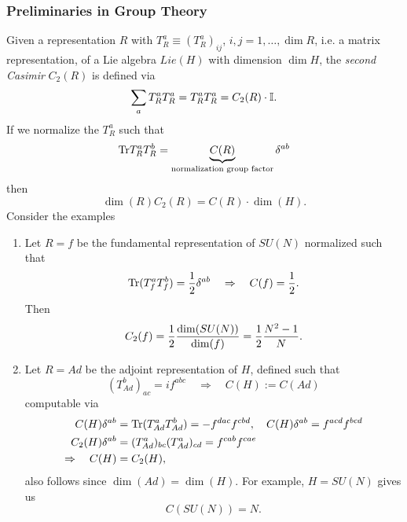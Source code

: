  \subsubsection{Preliminaries in Group Theory}
Given a representation $R$ with $T^a_R \equiv (T^a_R)_{ij}$, $i,j=1,\dots,\dim R$, i.e. a matrix representation, of a Lie algebra $Lie(H)$ with dimension $\dim H$, the \emph{second Casimir} $C_2(R)$ is defined via 
\begin{equation}
	\sum_a T^a_R T^a_R = T^a_R T^a_R= C_2(R) \cdot \mathbb{I}.
\end{equation}
If we normalize the $T^a_R$ such that
\begin{equation}
	\mathrm{Tr} T^a_R T^b_R = \underbrace{C(R)}_{\text{normalization group factor}} \delta^{ab}
\end{equation}
then
\begin{equation}
	\dim(R) C_2 (R) = C(R) \cdot \dim(H).
\end{equation}
Consider the examples
\begin{enumerate}
	\item Let $R=f$ be the fundamental representation of $SU(N)$ normalized such that\begin{equation}
		\mathrm{Tr}(T^a_f T^b_f) = \frac{1}{2} \delta^{ab} \quad \Rightarrow \quad C(f) = \frac{1}{2}.
	\end{equation}
	Then 
	\begin{equation}
		C_2(f) = \frac{1}{2} \frac{\dim(SU(N)) }{\dim(f)} = \frac{1}{2} \frac{N^2-1}{N}.
	\end{equation}
	\item Let $R=Ad$ be the adjoint representation of $H$, defined such that 
	\begin{equation}
		(T^b_{Ad})_{ac} = i f^{abc} \quad \Rightarrow \quad C(H) := C(Ad)
	\end{equation}
	computable via
	\begin{align*}
		C(H)\delta^{ab} &= \mathrm{Tr}(T^a_{Ad} T^b_{Ad})= -f^{dac} f^{cbd},\quad C(H) \delta^{ab} = f^{acd} f^{bcd} \\
		 C_2(H) \delta^{ab} &= (T^a_{Ad})_{bc} (T^a_{Ad})_{cd} = f^{cab} f^{cae} \\
		\Rightarrow \quad C(H) & = C_2(H),
	\end{align*}
also follows since $\dim(Ad)=\dim(H)$. For example, $H=SU(N)$ gives us 
\begin{equation*}
	C(SU(N)) = N.
\end{equation*}
\end{enumerate}



